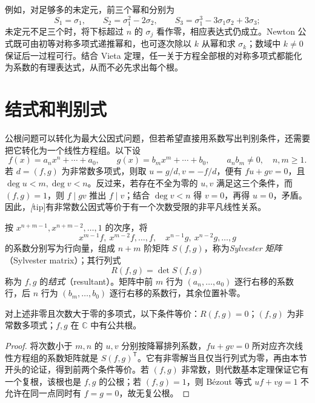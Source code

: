 例如，对足够多的未定元，前三个幂和分别为
\[
    S_1=\sigma_1,\qquad
    S_2=\sigma_1^2-2\sigma_2,\qquad
    S_3=\sigma_1^3-3\sigma_1\sigma_2+3\sigma_3;
\]
未定元不足三个时，将下标超过 $n$ 的 $\sigma_j$ 看作零，相应表达式仍成立。Newton 公式既可由初等对称多项式递推幂和，也可逐次除以 $k$ 从幂和求 $\sigma_k$；数域中 $k\ne0$ 保证后一过程可行。结合 Vieta 定理，任一关于方程全部根的对称多项式都能化为系数的有理表达式，从而不必先求出每个根。

\section{结式和判别式}
\label{sec:resultants-discriminants}

公根问题可以转化为最大公因式问题，但若希望直接用系数写出判别条件，还需要把它转化为一个线性方程组。以下设
\[
    f(x)=a_nx^n+\cdots+a_0,\qquad
    g(x)=b_mx^m+\cdots+b_0,
    \qquad a_nb_m\ne0,\quad n,m\geq1.
\]
若 $d=(f,g)$ 为非常数多项式，则取 $u=g/d,v=-f/d$，便有 $fu+gv=0$，且 $\deg u<m,\deg v<n$。反过来，若存在不全为零的 $u,v$ 满足这三个条件，而 $(f,g)=1$，则 $f\mid gv$ 推出 $f\mid v$；结合 $\deg v<n$ 得 $v=0$，再得 $u=0$，矛盾。因此，\emph[tip]{有非常数公因式等价于有一个次数受限的非平凡线性关系}。

\begin{definition}
\label{def:polynomial-resultant}
按 $x^{n+m-1},x^{n+m-2},\ldots,1$ 的次序，将
\[
    x^{m-1}f,\ x^{m-2}f,\ldots,f,
    \quad x^{n-1}g,\ x^{n-2}g,\ldots,g
\]
的系数分别写为行向量，组成 $n+m$ 阶矩阵 $S(f,g)$，称为\emph{Sylvester 矩阵}（Sylvester matrix）；其行列式
\begin{equation}
\label{eq:polynomial-resultant-definition}
    R(f,g)=\det S(f,g)
\end{equation}
称为 $f,g$ 的\emph{结式}（resultant）。矩阵中前 $m$ 行为 $(a_n,\ldots,a_0)$ 逐行右移的系数行，后 $n$ 行为 $(b_m,\ldots,b_0)$ 逐行右移的系数行，其余位置补零。
\end{definition}

\begin{theorem}
\label{thm:resultant-common-root}
对上述非零且次数大于零的多项式，以下条件等价：$R(f,g)=0$；$(f,g)$ 为非常数多项式；$f,g$ 在 $\mathbb C$ 中有公共根。
\end{theorem}
\begin{proof}
将次数小于 $m,n$ 的 $u,v$ 分别按降幂排列系数，$fu+gv=0$ 所对应齐次线性方程组的系数矩阵就是 $S(f,g)^{\mathsf T}$。它有非零解当且仅当行列式为零，再由本节开头的论证，得到前两个条件等价。若 $(f,g)$ 非常数，则代数基本定理保证它有一个复根，该根也是 $f,g$ 的公根；若 $(f,g)=1$，则 Bézout 等式 $uf+vg=1$ 不允许在同一点同时有 $f=g=0$，故无复公根。
\end{proof}

